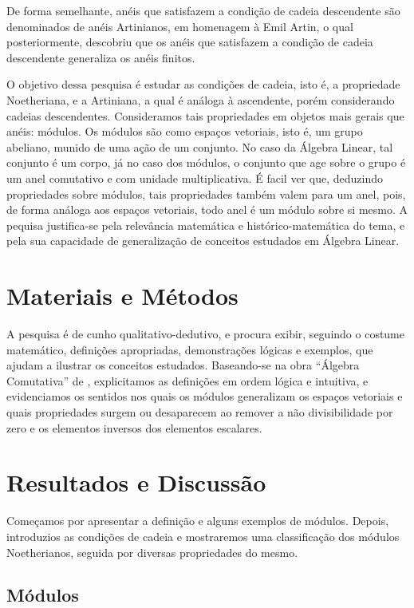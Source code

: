 De forma semelhante, anéis que satisfazem a condição de cadeia descendente são denominados de anéis Artinianos, em homenagem à Emil Artin, o qual posteriormente, descobriu que os anéis que satisfazem a condição de cadeia descendente generaliza os anéis finitos.

O objetivo dessa pesquisa é estudar as condições de cadeia, isto é, a propriedade Noetheriana, e a Artiniana, a qual é análoga à ascendente, porém considerando cadeias descendentes. Consideramos tais propriedades em objetos mais gerais que anéis: módulos.
Os módulos são como espaços vetoriais, isto é, um grupo abeliano, munido de uma ação de um conjunto. No caso da Álgebra Linear, tal conjunto é um corpo, já no caso dos módulos, o conjunto que age sobre o grupo é um anel comutativo e com unidade multiplicativa. É facil ver que, deduzindo propriedades sobre módulos, tais propriedades também valem para um anel, pois, de forma análoga aos espaços vetoriais, todo anel é um módulo sobre si mesmo.
A pequisa justifica-se pela relevância matemática e histórico-matemática do tema, e pela sua capacidade de generalização de conceitos estudados em Álgebra Linear.

\section*{Materiais e Métodos}

\recuo A pesquisa é de cunho qualitativo-dedutivo, e procura exibir, seguindo o costume matemático, definições apropriadas, demonstrações lógicas e exemplos, que ajudam a ilustrar os conceitos estudados. Baseando-se na obra ``Álgebra Comutativa'' de \textcite{macdonald}, explicitamos as definições em ordem lógica e intuitiva, e evidenciamos os sentidos nos quais os módulos generalizam os espaços vetoriais e quais propriedades surgem ou desaparecem ao remover a não divisibilidade por zero e os elementos inversos dos elementos escalares.

\section*{Resultados e Discussão}

\recuo Começamos por apresentar a definição e alguns exemplos de módulos. Depois, introduzios as condições de cadeia e mostraremos uma classificação dos módulos Noetherianos, seguida por diversas propriedades do mesmo.


\subsection*{Módulos}

